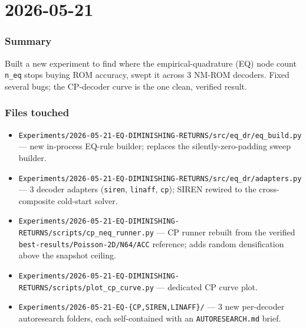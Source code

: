 \section{2026-05-21}


\subsubsection*{Summary}
Built a new experiment to find where the empirical-quadrature (EQ) node
count \texttt{n\_eq} stops buying ROM accuracy, swept it across 3 NM-ROM
decoders. Fixed several bugs; the CP-decoder curve is the one clean,
verified result.

\subsubsection*{Files touched}
\begin{itemize}
  \item \texttt{Experiments/2026-05-21-EQ-DIMINISHING-RETURNS/src/eq\_dr/eq\_build.py} --- new in-process EQ-rule builder; replaces the silently-zero-padding sweep builder.
  \item \texttt{Experiments/2026-05-21-EQ-DIMINISHING-RETURNS/src/eq\_dr/adapters.py} --- 3 decoder adapters (\texttt{siren}, \texttt{linaff}, \texttt{cp}); SIREN rewired to the cross-composite cold-start solver.
  \item \texttt{Experiments/2026-05-21-EQ-DIMINISHING-RETURNS/scripts/cp\_neq\_runner.py} --- CP runner rebuilt from the verified \texttt{best-results/Poisson-2D/N64/ACC} reference; adds random densification above the snapshot ceiling.
  \item \texttt{Experiments/2026-05-21-EQ-DIMINISHING-RETURNS/scripts/plot\_cp\_curve.py} --- dedicated CP curve plot.
  \item \texttt{Experiments/2026-05-21-EQ-\{CP,SIREN,LINAFF\}/} --- 3 new per-decoder autoresearch folders, each self-contained with an \texttt{AUTORESEARCH.md} brief.
\end{itemize}

